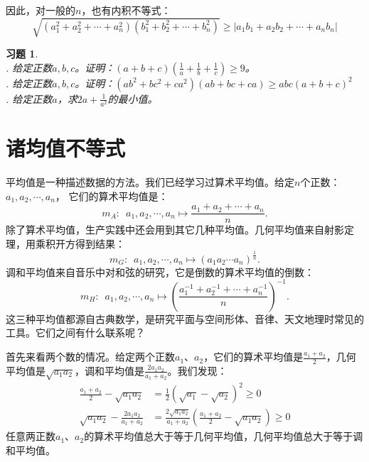 \documentclass[12pt,UTF8]{ctexbook}
\newtheorem{xt}{习题}[section]
\begin{document}
因此，对一般的$n$，也有内积不等式：
$$ \sqrt{(a_1^2 + a_2^2 + \cdots + a_n^2)(b_1^2 + b_2^2 + \cdots + b_n^2)} \geqslant |a_1b_1 + a_2b_2+ \cdots + a_nb_n|$$

\begin{xt}    
    \mbox{}\\
    . 给定正数$a,b,c$。证明：$(a + b + c)(\frac{1}{a}+\frac{1}{b}+\frac{1}{c}) \geqslant 9$。\\
    . 给定正数$a,b,c$。证明：$(ab^2 + bc^2 + ca^2)(ab + bc + ca) \geqslant abc(a+b+c)^2$ \\
    . 给定正数$a$，求$2a + \frac{1}{a^2}$的最小值。
\end{xt}

\section{诸均值不等式}

平均值是一种描述数据的方法。我们已经学习过算术平均值。给定$n$个正数：$a_1, a_2, \cdots , a_n$，
它们的算术平均值是：
$$ m_A : \,\,\, a_1, a_2, \cdots , a_n \mapsto \frac{a_1 + a_2 + \cdots + a_n}{n}. $$
除了算术平均值，生产实践中还会用到其它几种平均值。几何平均值来自射影定理，用乘积开方得到结果：
$$ m_G :\,\,\, a_1, a_2, \cdots , a_n \mapsto  (a_1a_2\cdots a_n)^{\frac{1}{n}}.$$
调和平均值来自音乐中对和弦的研究，它是倒数的算术平均值的倒数：
$$ m_H : \,\,\, a_1, a_2, \cdots , a_n \mapsto \left(\frac{a_1^{-1} + a_2^{-1} + \cdots + a_n^{-1}}{n}\right)^{-1}. $$
这三种平均值都源自古典数学，是研究平面与空间形体、音律、天文地理时常见的工具。它们之间有什么联系呢？

首先来看两个数的情况。给定两个正数$a_1$、$a_2$，它们的算术平均值是$\frac{a_1 + a_2}{2}$，几何平均值是$\sqrt{a_1a_2}$，调和平均值是$\frac{2a_1a_2}{a_1 + a_2}$。我们发现：
\begin{align*}
    \frac{a_1 + a_2}{2} - \sqrt{a_1a_2} &= \frac{1}{2}(\sqrt{a_1} - \sqrt{a_2})^2 \geqslant 0  \\
    \sqrt{a_1a_2} - \frac{2a_1a_2}{a_1 + a_2} &= \frac{2\sqrt{a_1a_2}}{a_1 + a_2}\left(\frac{a_1 + a_2}{2} - \sqrt{a_1a_2}\right) \geqslant 0 
\end{align*}
任意两正数$a_1$、$a_2$的算术平均值总大于等于几何平均值，几何平均值总大于等于调和平均值。
\end{document}
